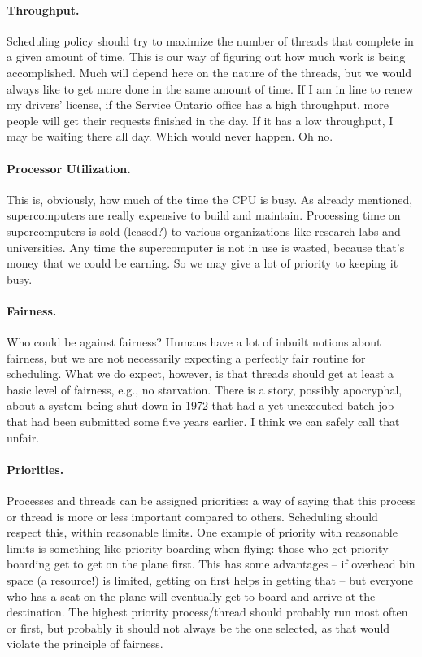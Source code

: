\paragraph{Throughput.} Scheduling policy should try to maximize the number of threads that complete in a given amount of time. This is our way of figuring out how much work is being accomplished. Much will depend here on the nature of the threads, but we would always like to get more done in the same amount of time. If I am in line to renew my drivers' license, if the Service Ontario office has a high throughput, more people will get their requests finished in the day. If it has a low throughput, I may be waiting there all day. Which would never happen. Oh no.

\paragraph{Processor Utilization.} This is, obviously, how much of the time the CPU is busy. As already mentioned, supercomputers are really expensive to build and maintain. Processing time on supercomputers is sold (leased?) to various organizations like research labs and universities. Any time the supercomputer is not in use is wasted, because that's money that we could be earning. So we may give a lot of priority to keeping it busy.

\paragraph{Fairness.} Who could be against fairness? Humans have a lot of inbuilt notions about fairness, but we are not necessarily expecting a perfectly fair routine for scheduling. What we do expect, however, is that threads should get at least a basic level of fairness, e.g., no starvation. There is a story, possibly apocryphal, about a system being shut down in 1972 that had a yet-unexecuted batch job that had been submitted some five years earlier. I think we can safely call that unfair.

\paragraph{Priorities.} Processes and threads can be assigned priorities: a way of saying that this process or thread is more or less important compared to others. Scheduling should respect this, within reasonable limits. One example of priority with reasonable limits is something like priority boarding when flying: those who get priority boarding get to get on the plane first. This has some advantages -- if overhead bin space (a resource!) is limited, getting on first helps in getting that -- but everyone who has a seat on the plane will eventually get to board and arrive at the destination.  The highest priority process/thread should probably run most often or first, but probably it should not always be the one selected, as that would violate the principle of fairness.

